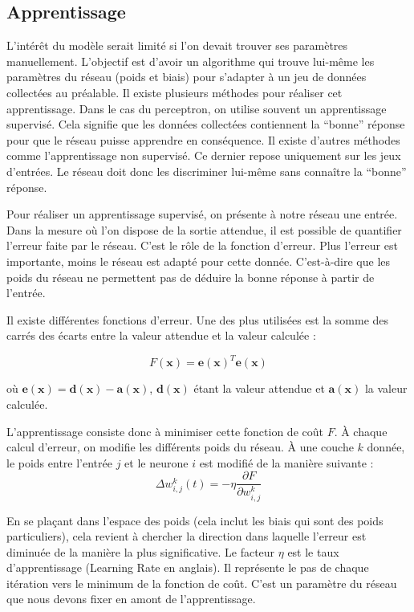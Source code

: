 \subsection{Apprentissage}

L'intérêt du modèle serait limité si l'on devait trouver ses paramètres manuellement. L'objectif est d'avoir un algorithme qui trouve lui-même les paramètres du réseau (poids et biais) pour s'adapter à un jeu de données collectées au préalable. Il existe plusieurs méthodes pour réaliser cet apprentissage. Dans le cas du perceptron, on utilise souvent un apprentissage supervisé. Cela signifie que les données collectées contiennent la ``bonne'' réponse pour que le réseau puisse apprendre en conséquence. Il existe d'autres méthodes comme l'apprentissage non supervisé. Ce dernier repose uniquement sur les jeux d'entrées. Le réseau doit donc les discriminer lui-même sans connaître la ``bonne'' réponse.

Pour réaliser un apprentissage supervisé, on présente à notre réseau une entrée. Dans la mesure où l'on dispose de la sortie attendue, il est possible de quantifier l'erreur faite par le réseau.
C'est le rôle de la fonction d'erreur. Plus l'erreur est importante, moins le réseau est adapté pour cette donnée. C'est-à-dire que les poids du réseau ne permettent pas de déduire la bonne réponse à partir de l'entrée.

Il existe différentes fonctions d'erreur. Une des plus utilisées est la somme des carrés des écarts entre la valeur attendue et la valeur calculée :

\begin{equation}
\displaystyle F\left(\mathbf{x}\right) = \mathbf{e\left(x\right)}^T\mathbf{e\left(x\right)} 
\end{equation}

où $\displaystyle \mathbf{e\left(x\right)} = \mathbf{d\left(x\right)} - \mathbf{a\left(x\right)} $,
$\mathbf{d\left(x\right)}$ étant la valeur attendue et $\mathbf{a\left(x\right)}$ la valeur calculée.


L'apprentissage consiste donc à minimiser cette fonction de coût $F$. À chaque calcul d'erreur, on modifie les différents poids du réseau.
À une couche $k$ donnée, le poids entre l'entrée $j$ et le neurone $i$ est modifié de la manière suivante : 
\begin{equation}
 \Delta w^k_{i,j}\left(t\right) = - \eta \frac{\partial F}{\partial w^k_{i,j}}
\end{equation}
 
En se plaçant dans l'espace des poids (cela inclut les biais qui sont des poids particuliers), cela revient à chercher la direction dans laquelle l'erreur est diminuée de la manière la plus significative. Le facteur $\eta$ est le taux d'apprentissage (Learning Rate en anglais). Il représente le pas de chaque itération vers le minimum de la fonction de coût. C'est un paramètre du réseau que nous devons fixer en amont de l'apprentissage.

